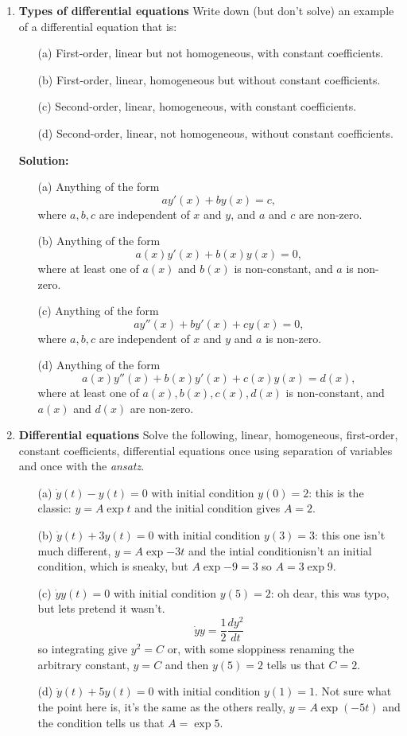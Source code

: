 \documentclass[11pt,a4paper]{scrartcl}
\begin{document}
\begin{enumerate}
  
\item \textbf{Types of differential equations}
  Write down (but don't solve) an example of a differential equation that is:
  \begin{itemize}
  \item[(a)] First-order, linear but not homogeneous, with constant coefficients.
  \item[(b)] First-order, linear, homogeneous but without constant coefficients.
  \item[(c)] Second-order, linear, homogeneous, with constant coefficients.
  \item[(d)] Second-order, linear, not homogeneous, without constant coefficients.
  \end{itemize}
	\textbf{Solution:}
	\begin{itemize}
		\item[(a)] Anything of the form
		\[ay'(x) + by(x) = c,\]
		where $a,b,c$ are independent of $x$ and $y$, and $a$ and $c$ are non-zero.
		\item[(b)] Anything of the form
		\[a(x)y'(x) + b(x)y(x) = 0,\]
		where at least one of $a(x)$ and $b(x)$ is non-constant, and $a$ is non-zero.
		\item[(c)] Anything of the form
		\[ay''(x) + by'(x) + cy(x) = 0,\]
		where $a,b,c$ are independent of $x$ and $y$ and $a$ is non-zero.
		\item[(d)] Anything of the form
		\[a(x)y''(x) + b(x)y'(x) + c(x)y(x) = d(x),\]
		where at least one of $a(x), b(x), c(x), d(x)$ is non-constant, and
		$a(x)$ and $d(x)$ are non-zero.
	\end{itemize}


  
\item \textbf{Differential equations} Solve the following, linear,
  homogeneous, first-order, constant coefficients, differential
  equations once using separation of variables and once with the
  \emph{ansatz}.
	\begin{itemize}
		\item[(a)] $\dot{y}(t) - y(t) = 0$ with initial condition $y(0) = 2$: this is the classic: $y=A\exp{t}$ and the initial condition gives $A=2$.
		\item[(b)] $\dot{y}(t) + 3y(t) = 0$ with initial condition $y(3) = 3$: this one isn't much different, $y=A\exp{-3t}$ and the intial conditionisn't an initial condition, which is sneaky, but $A\exp{-9}=3$ so $A=3\exp{9}$.
		\item[(c)] $\dot{y}y(t) = 0$ with  initial condition $y(5) = 2$: oh dear, this was typo, but lets pretend it wasn't.
                  $$\dot{y}y=\frac{1}{2}\frac{dy^2}{dt}$$
                  so integrating give $y^2=C$ or, with some sloppiness renaming the arbitrary constant, $y=C$ and then $y(5)=2$ tells us that $C=2$. 
		\item[(d)] $\dot{y}(t) + 5y(t) = 0$ with initial condition
                  $y(1) = 1$. Not sure what the point here is, it's the same as the others really, $y=A\exp{(-5t)}$ and the condition tells us that $A=\exp{5}$.
	\end{itemize}

\end{enumerate}
\end{document}
